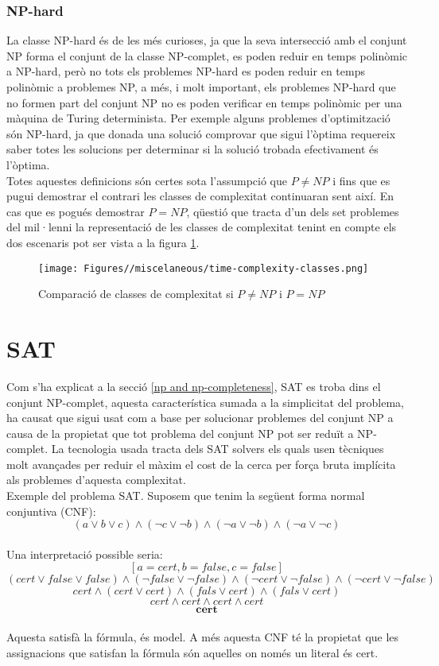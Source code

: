 \subsubsection{NP-hard}
La classe NP-hard és de les més curioses, ja que la seva intersecció amb el conjunt NP forma el conjunt de la classe NP-complet, es poden reduir en temps polinòmic a NP-hard, però no tots els problemes NP-hard es poden reduir en temps polinòmic a problemes NP, a més, i molt important, els problemes NP-hard que no formen part del conjunt NP no es poden verificar en temps polinòmic per una màquina de Turing determinista. Per exemple alguns problemes d'optimització són NP-hard, ja que donada una solució comprovar que sigui l'òptima requereix saber totes les solucions per determinar si la solució trobada efectivament és l'òptima.\\
Totes aquestes definicions són certes sota l'assumpció que \(P\neq NP\) i fins que es pugui demostrar el contrari les classes de complexitat continuaran sent així. En cas que es pogués demostrar \(P = NP\), qüestió que tracta d'un dels set problemes del mil·lenni la representació de les classes de complexitat tenint en compte els dos escenaris pot ser vista a la figura \ref{fig:time-complexity-sets}.

\begin{figure}
    \centering
    \texttt{[image: Figures//miscelaneous/time-complexity-classes.png]}
    \caption{Comparació de classes de complexitat si \(P\neq NP\) i \(P = NP\)}
    \label{fig:time-complexity-sets}
\end{figure}

\section{SAT}
Com s'ha explicat a la secció \ref{np and np-completeness}, SAT es troba dins el conjunt NP-complet, aquesta característica sumada a la simplicitat del problema, ha causat que sigui usat com a base per solucionar problemes del conjunt NP a causa de la propietat que tot problema del conjunt NP pot ser reduït a NP-complet. La tecnologia usada tracta dels SAT solvers els quals usen tècniques molt avançades per reduir el màxim el cost de la cerca per força bruta implícita als problemes d'aquesta complexitat.\\
Exemple del problema SAT.
Suposem que tenim la següent forma normal conjuntiva (CNF):\\
$$(a \lor b \lor c) \land (\lnot c \lor \lnot b) \land (\lnot a \lor \lnot b) \land (\lnot a \lor \lnot c) $$\\
Una interpretació possible seria:\\
$$ [a = cert, b = false, c = false]$$
$$(cert \lor false \lor false) \land (\lnot false \lor \lnot false) \land (\lnot cert \lor \lnot false) \land (\lnot cert \lor \lnot false) $$
$$cert  \land (cert \lor cert) \land (fals \lor cert) \land (fals \lor cert) $$
$$cert \land cert  \land cert \land cert $$
$$\textbf{cert}$$\\
Aquesta satisfà la fórmula, és model. A més aquesta CNF té la propietat que les assignacions que satisfan la fórmula són aquelles on només un literal és cert.\\

